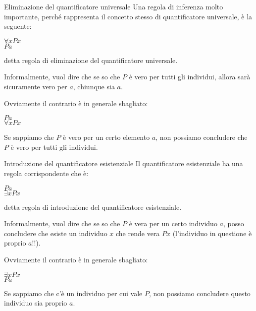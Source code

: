 \documentclass[10pt,dvipsnames,xcolor=table,handout]{beamer}
\begin{document}
\begin{frame}{Eliminazione del quantificatore universale}
    Una regola di inferenza molto importante, perché rappresenta il concetto stesso di quantificatore universale, è la seguente:
    \begin{center}
        \begin{inference}
            $\forall x Px$\\
            \hline
            $Pa$
        \end{inference}
    \end{center}
    detta regola di \alert{eliminazione del quantificatore universale}.

    \medskip
    Informalmente, vuol dire che se so che $P$ è vero per tutti gli individui, allora sarà sicuramente vero per $a$, chiunque sia $a$.

    \medskip
    Ovviamente il contrario è in generale sbagliato:
    \begin{center}
        \begin{inference}
            $Pa$\\
            \hline
            $\forall x Px$
        \end{inference}
    \end{center}
    Se sappiamo che $P$ è vero per un certo elemento $a$, non possiamo concludere che $P$ è vero per tutti gli individui.
\end{frame}

\begin{frame}{Introduzione del quantificatore esistenziale}
    Il quantificatore esistenziale ha una regola corrispondente che è:
    \begin{center}
        \begin{inference}
            $Pa$\\
            \hline
            $\exists x Px$
        \end{inference}
    \end{center}
    detta regola di \alert{introduzione del quantificatore esistenziale}.

    \medskip
    Informalmente, vuol dire che se so che $P$ è vera per un certo individuo $a$, posso concludere che esiste un individuo $x$ che rende vera $Px$ (l'individuo in questione è proprio $a$!!).

    \medskip
    Ovviamente il contrario è in generale sbagliato:
    \begin{center}
        \begin{inference}
            $\exists x Px$\\
            \hline
            $Pa$
        \end{inference}
    \end{center}
    Se sappiamo che c'è un individuo per cui vale $P$, non possiamo concludere questo individuo sia proprio $a$.
\end{frame}
\end{document}
